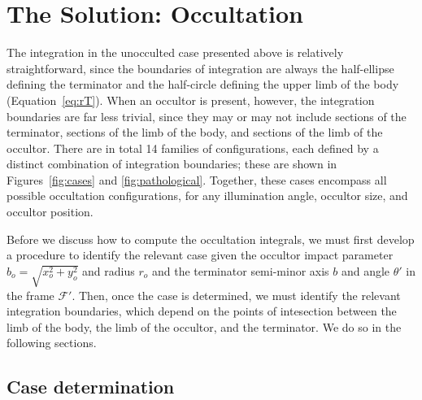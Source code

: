 \documentclass[modern]{aastex62}
\begin{document}
\section{The Solution: Occultation}
\label{sec:solution-occ}
%
The integration in the unocculted case presented above is relatively
straightforward, since
the boundaries of integration are always the half-ellipse defining the
terminator and the half-circle defining the upper limb of the body
(Equation~\ref{eq:rT}). When an occultor is present, however, the
integration boundaries are far less trivial, since they may or may not
include sections of the terminator, sections of the limb of the body,
and sections of the limb of the occultor. There are in total 14 families of
configurations, each defined by a distinct combination of integration
boundaries; these are shown in Figures~\ref{fig:cases} and
\ref{fig:pathological}.
Together, these cases encompass all possible
occultation configurations, for any illumination angle, occultor size, and
occultor position.


Before we discuss how to compute the occultation integrals, we must first
develop a procedure to identify the relevant case given the occultor
impact parameter $b_o = \sqrt{x_o^2 + y_o^2}$ and radius $r_o$ and
the terminator semi-minor
axis $b$ and angle $\theta'$ in the frame $\mathcal{F}'$.
Then, once the case is determined, we must
identify the relevant integration boundaries, which depend on the points
of intesection between the limb of the body, the limb of the occultor, and
the terminator. We do so in the following sections.

%

\subsection{Case determination}
\label{sec:which-case}
\end{document}
